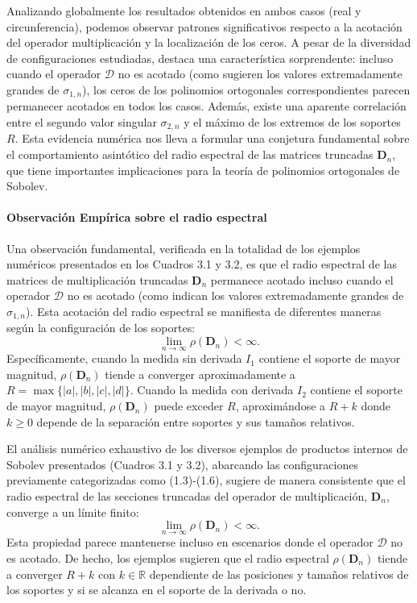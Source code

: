 Analizando globalmente los resultados obtenidos en ambos casos (real y circunferencia), podemos observar patrones significativos respecto a la acotación del operador multiplicación y la localización de los ceros. A pesar de la diversidad de configuraciones estudiadas, destaca una característica sorprendente: incluso cuando el operador $\mathcal{D}$ no es acotado (como sugieren los valores extremadamente grandes de $\sigma_{1,n}$), los ceros de los polinomios ortogonales correspondientes parecen permanecer acotados en todos los casos. Además, existe una aparente correlación entre el segundo valor singular $\sigma_{2,n}$ y el máximo de los extremos de los soportes $R$. Esta evidencia numérica nos lleva a formular una conjetura fundamental sobre el comportamiento asintótico del radio espectral de las matrices truncadas $\mathbf{D}_n$, que tiene importantes implicaciones para la teoría de polinomios ortogonales de Sobolev.

\paragraph{Observación Empírica sobre el radio espectral}
Una observación fundamental, verificada en la totalidad de los ejemplos numéricos presentados en los Cuadros 3.1 y 3.2, es que el radio espectral de las matrices de multiplicación truncadas $\mathbf{D}_n$ permanece acotado incluso cuando el operador $\mathcal{D}$ no es acotado (como indican los valores extremadamente grandes de $\sigma_{1,n}$). Esta acotación del radio espectral se manifiesta de diferentes maneras según la configuración de los soportes:
$$
  \lim_{n \to \infty} \rho(\mathbf{D}_n) < \infty.
$$
Específicamente, cuando la medida sin derivada $I_1$ contiene el soporte de mayor magnitud, $\rho(\mathbf{D}_n)$ tiende a converger aproximadamente a $R = \max\{|a|,|b|,|c|,|d|\}$. Cuando la medida con derivada $I_2$ contiene el soporte de mayor magnitud, $\rho(\mathbf{D}_n)$ puede exceder $R$, aproximándose a $R + k$ donde $k \geq 0$ depende de la separación entre soportes y sus tamaños relativos.

\begin{conjetura}
  \label{conj:rho_Dn_bounded}
  El análisis numérico exhaustivo de los diversos ejemplos de productos internos de Sobolev presentados (Cuadros 3.1 y 3.2), abarcando las configuraciones previamente categorizadas como (1.3)-(1.6), sugiere de manera consistente que el radio espectral de las secciones truncadas del operador de multiplicación, $\mathbf{D}_n$, converge a un límite finito:
  $$
    \lim_{n \to \infty} \rho(\mathbf{D}_n) < \infty.
  $$
  Esta propiedad parece mantenerse incluso en escenarios donde el operador $\mathcal{D}$ no es acotado. De hecho, los ejemplos sugieren que el radio espectral $\rho(\mathbf{D}_n)$ tiende a converger $R + k$ con $k \in \mathbb{R}$ dependiente de las posiciones y tamaños relativos de los soportes y si se alcanza en el soporte de la derivada o no.
\end{conjetura}

